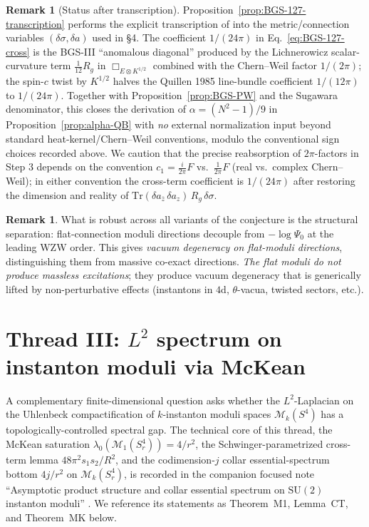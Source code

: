 \documentclass[11pt,letterpaper]{article}
\theoremstyle{definition}
\newtheorem{remark}[theorem]{Remark}
\newcommand{\cM}{\mathcal{M}}
\newcommand{\Tr}{\mathrm{Tr}}
\begin{document}
\begin{remark}[Status after transcription]\label{rmk:QB-status}
Proposition~\ref{prop:BGS-127-transcription} performs the explicit transcription of \cite[Thm.\ 1.27]{BismutGilletSoule1988} into the metric/connection variables $(\delta\sigma, \delta a)$ used in \S 4. The coefficient $1/(24\pi)$ in Eq.~\eqref{eq:BGS-127-cross} is the BGS-III ``anomalous diagonal'' produced by the Lichnerowicz scalar-curvature term $\tfrac{1}{12}R_g$ in $\Box_{E\otimes K^{1/2}}$ combined with the Chern--Weil factor $1/(2\pi)$; the spin-$c$ twist by $K^{1/2}$ halves the Quillen 1985 line-bundle coefficient $1/(12\pi)$ to $1/(24\pi)$. Together with Proposition~\ref{prop:BGS-PW} and the Sugawara denominator, this closes the derivation of $\alpha = (N^2-1)/9$ in Proposition~\ref{prop:alpha-QB} with \emph{no} external normalization input beyond standard heat-kernel/Chern--Weil conventions, modulo the conventional sign choices recorded above. We caution that the precise reabsorption of $2\pi$-factors in Step 3 depends on the convention $c_1 = \tfrac{i}{2\pi}F$ vs.\ $\tfrac{1}{2\pi}F$ (real vs.\ complex Chern--Weil); in either convention the cross-term coefficient is $1/(24\pi)$ after restoring the dimension and reality of $\Tr(\delta a_{\bar z}\,\delta a_z)\,R_g\,\delta\sigma$.
\end{remark}

\begin{remark}\label{rmk:no-gap-closure}
What is robust across all variants of the conjecture is the structural separation: flat-connection moduli directions decouple from $-\log\Psi_0$ at the leading WZW order. This gives \emph{vacuum degeneracy on flat-moduli directions}, distinguishing them from massive co-exact directions. \emph{The flat moduli do not produce massless excitations}; they produce vacuum degeneracy that is generically lifted by non-perturbative effects (instantons in $4$d, $\theta$-vacua, twisted sectors, etc.).
\end{remark}

\section{Thread III: $L^2$ spectrum on instanton moduli via McKean}\label{sec:moduli}

A complementary finite-dimensional question asks whether the $L^2$-Laplacian on the Uhlenbeck compactification of $k$-instanton moduli spaces $\cM_k(S^4)$ has a topologically-controlled spectral gap. The technical core of this thread, the McKean saturation $\lambda_0(\cM_1(S^4_r)) = 4/r^2$, the Schwinger-parametrized cross-term lemma $48\pi^2 s_1 s_2/R^2$, and the codimension-$j$ collar essential-spectrum bottom $4j/r^2$ on $\cM_k(S^4_r)$, is recorded in the companion focused note ``Asymptotic product structure and collar essential spectrum on $\mathrm{SU}(2)$ instanton moduli'' \cite{bonfioli-core}. We reference its statements as Theorem~M1, Lemma~CT, and Theorem~MK below.
\end{document}
